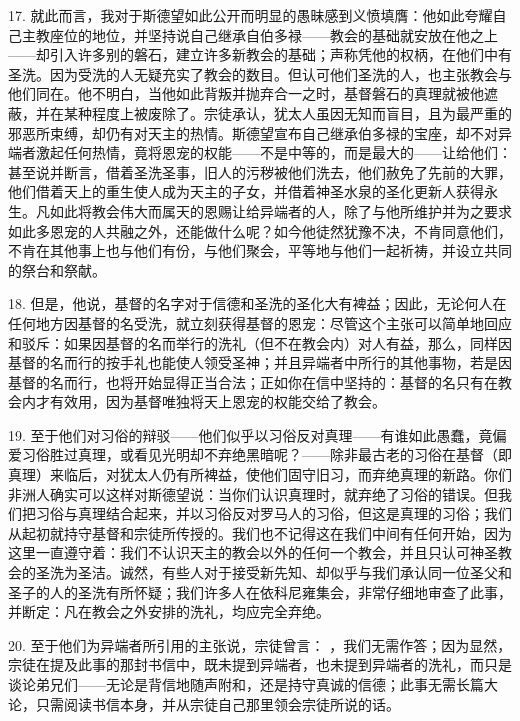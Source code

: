 17. 就此而言，我对于斯德望如此公开而明显的愚昧感到义愤填膺：他如此夸耀自己主教座位的地位，并坚持说自己继承自伯多禄——教会的基础就安放在他之上——却引入许多别的磐石，建立许多新教会的基础；声称凭他的权柄，在他们中有圣洗。因为受洗的人无疑充实了教会的数目。但认可他们圣洗的人，也主张教会与他们同在。他不明白，当他如此背叛并抛弃合一之时，基督磐石的真理就被他遮蔽，并在某种程度上被废除了。宗徒承认，犹太人虽因无知而盲目，且为最严重的邪恶所束缚，却仍有对天主的热情。斯德望宣布自己继承伯多禄的宝座，却不对异端者激起任何热情，竟将恩宠的权能——不是中等的，而是最大的——让给他们：甚至说并断言，借着圣洗圣事，旧人的污秽被他们洗去，他们赦免了先前的大罪，他们借着天上的重生使人成为天主的子女，并借着神圣水泉的圣化更新人获得永生。凡如此将教会伟大而属天的恩赐让给异端者的人，除了与他所维护并为之要求如此多恩宠的人共融之外，还能做什么呢？如今他徒然犹豫不决，不肯同意他们，不肯在其他事上也与他们有份，与他们聚会，平等地与他们一起祈祷，并设立共同的祭台和祭献。\par

18. 但是，他说，基督的名字对于信德和圣洗的圣化大有裨益；因此，无论何人在任何地方因基督的名受洗，就立刻获得基督的恩宠：尽管这个主张可以简单地回应和驳斥：如果因基督的名而举行的洗礼（但不在教会内）对人有益，那么，同样因基督的名而行的按手礼也能使人领受圣神；并且异端者中所行的其他事物，若是因基督的名而行，也将开始显得正当合法；正如你在信中坚持的：基督的名只有在教会内才有效用，因为基督唯独将天上恩宠的权能交给了教会。\par

19. 至于他们对习俗的辩驳——他们似乎以习俗反对真理——有谁如此愚蠢，竟偏爱习俗胜过真理，或看见光明却不弃绝黑暗呢？——除非最古老的习俗在基督（即真理）来临后，对犹太人仍有所裨益，使他们固守旧习，而弃绝真理的新路。你们非洲人确实可以这样对斯德望说：当你们认识真理时，就弃绝了习俗的错误。但我们把习俗与真理结合起来，并以习俗反对罗马人的习俗，但这是真理的习俗；我们从起初就持守基督和宗徒所传授的。我们也不记得这在我们中间有任何开始，因为这里一直遵守着：我们不认识天主的教会以外的任何一个教会，并且只认可神圣教会的圣洗为圣洁。诚然，有些人对于接受新先知、却似乎与我们承认同一位圣父和圣子的人的圣洗有所怀疑；我们许多人在依科尼雍集会，非常仔细地审查了此事，并断定：凡在教会之外安排的洗礼，均应完全弃绝。\par

20. 至于他们为异端者所引用的主张说，宗徒曾言： ，我们无需作答；因为显然，宗徒在提及此事的那封书信中，既未提到异端者，也未提到异端者的洗礼，而只是谈论弟兄们——无论是背信地随声附和，还是持守真诚的信德；此事无需长篇大论，只需阅读书信本身，并从宗徒自己那里领会宗徒所说的话。\par

